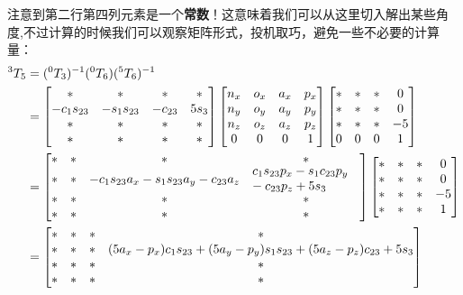 \documentclass{ctexart}
\begin{document}
注意到第二行第四列元素是一个\textbf{常数}！这意味着我们可以从这里切入解出某些角度,不过计算的时候我们可以观察矩阵形式，投机取巧，避免一些不必要的计算量：
\begin{equation}
	\begin{aligned}
		^3T_5&=(^0T_3)^{-1}(^0T_6)(^5T_6)^{-1}\\
		&=\begin{bmatrix}
			* & * & * & * \\
			-c_1s_{23} & -s_1s_{23} & -c_{23} & 5s_3 \\
			* & * & * & * \\
			* & * & * & *
		\end{bmatrix}
		\begin{bmatrix}
			n_x & o_x & a_x & p_x \\
			n_y & o_y & a_y & p_y \\
			n_z & o_z & a_z & p_z \\
			0 & 0 & 0 & 1
		\end{bmatrix}
		\begin{bmatrix}
			* & * & * & 0\\
			* & * & * & 0\\
			* & * & * & -5\\
			0 & 0 & 0 & 1
		\end{bmatrix}\\
		&=
		\begin{bmatrix}
			* & * & * & * \\
			* & * & -c_1s_{23}a_x-s_1s_{23}a_y-c_{23}a_z &  \parbox{3cm}{ $c_1s_{23}p_x-s_1c_{23}p_y\\-c_{23}p_z+5s_3$} \\
			* & * & * & * \\
			* & * & * & *
		\end{bmatrix}
		\begin{bmatrix}
			* & * & * & 0\\
			* & * & * & 0\\
			* & * & * & -5\\
			* & * & * & 1\\
		\end{bmatrix}\\
		&=\begin{bmatrix}
			* & * & * & * \\
			* & * & *& (5a_x-p_x)c_1s_{23}+(5a_y-p_y)s_1s_{23}+(5a_z-p_z)c_{23}+5s_3 \\
			* & * & * & * \\
			* & * & * & *
		\end{bmatrix}
	\end{aligned}
\end{equation}
\end{document}
